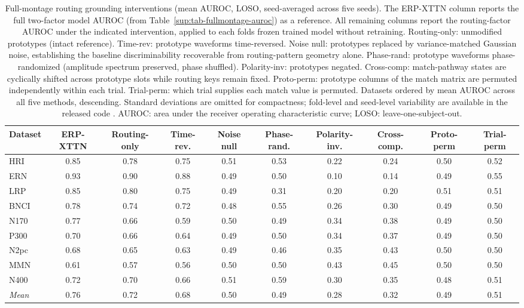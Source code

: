 \begin{table}[t]
\centering
\setlength{\tabcolsep}{5pt}
\caption{%
Full-montage routing grounding interventions (mean AUROC, LOSO, seed-averaged across five seeds). The ERP-XTTN column reports the full two-factor model AUROC (from Table~\ref{sup:tab-fullmontage-auroc}) as a reference. All remaining columns report the routing-factor AUROC under the indicated intervention, applied to each fold\textquotesingle s frozen trained model without retraining. Routing-only: unmodified prototypes (intact reference). Time-rev: prototype waveforms time-reversed. Noise null: prototypes replaced by variance-matched Gaussian noise, establishing the baseline discriminability recoverable from routing-pattern geometry alone. Phase-rand: prototype waveforms phase-randomized (amplitude spectrum preserved, phase shuffled). Polarity-inv: prototypes negated. Cross-comp: match-pathway states are cyclically shifted across prototype slots while routing keys remain fixed. Proto-perm: prototype columns of the match matrix are permuted independently within each trial. Trial-perm: which trial supplies each match value is permuted. Datasets ordered by mean AUROC across all five methods, descending. Standard deviations are omitted for compactness; fold-level and seed-level variability are available in the released code \cite{wyman2026erpxttn_code}. AUROC: area under the receiver operating characteristic curve; LOSO: leave-one-subject-out.%
}
\label{sup:tab-grounding-full-routing}
\begin{tabular}{lccccccccc}
\toprule
Dataset & ERP-XTTN & Routing-only & Time-rev. & Noise null & Phase-rand. & Polarity-inv. & Cross-comp. & Proto-perm & Trial-perm \\
\midrule
HRI & 0.85 & 0.78 & 0.75 & 0.51 & 0.53 & 0.22 & 0.24 & 0.50 & 0.52 \\
ERN & 0.93 & 0.90 & 0.88 & 0.49 & 0.50 & 0.10 & 0.14 & 0.49 & 0.55 \\
LRP & 0.85 & 0.80 & 0.75 & 0.49 & 0.31 & 0.20 & 0.20 & 0.51 & 0.51 \\
BNCI & 0.78 & 0.74 & 0.72 & 0.48 & 0.55 & 0.26 & 0.30 & 0.49 & 0.50 \\
N170 & 0.77 & 0.66 & 0.59 & 0.50 & 0.49 & 0.34 & 0.38 & 0.49 & 0.50 \\
P300 & 0.70 & 0.66 & 0.64 & 0.49 & 0.50 & 0.34 & 0.37 & 0.49 & 0.50 \\
N2pc & 0.68 & 0.65 & 0.63 & 0.49 & 0.46 & 0.35 & 0.43 & 0.50 & 0.50 \\
MMN & 0.61 & 0.57 & 0.56 & 0.50 & 0.50 & 0.43 & 0.45 & 0.50 & 0.50 \\
N400 & 0.72 & 0.70 & 0.66 & 0.51 & 0.59 & 0.30 & 0.35 & 0.48 & 0.51 \\
\midrule
\textit{Mean} & 0.76 & 0.72 & 0.68 & 0.50 & 0.49 & 0.28 & 0.32 & 0.49 & 0.51 \\
\bottomrule
\end{tabular}
\end{table}
